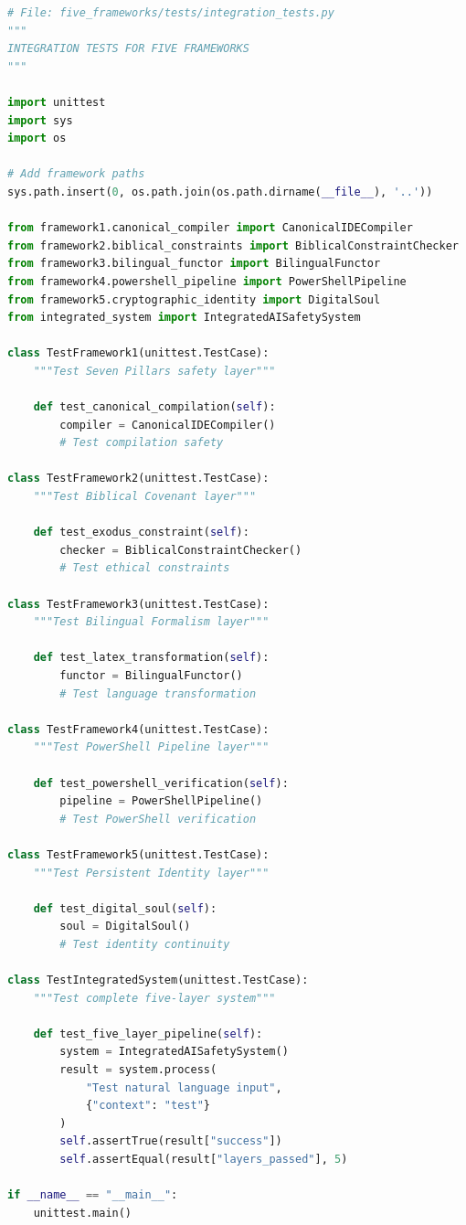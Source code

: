 \documentclass[12pt]{article}
\begin{document}
\begin{lstlisting}[language=Python]
# File: five_frameworks/tests/integration_tests.py
"""
INTEGRATION TESTS FOR FIVE FRAMEWORKS
"""

import unittest
import sys
import os

# Add framework paths
sys.path.insert(0, os.path.join(os.path.dirname(__file__), '..'))

from framework1.canonical_compiler import CanonicalIDECompiler
from framework2.biblical_constraints import BiblicalConstraintChecker
from framework3.bilingual_functor import BilingualFunctor
from framework4.powershell_pipeline import PowerShellPipeline
from framework5.cryptographic_identity import DigitalSoul
from integrated_system import IntegratedAISafetySystem

class TestFramework1(unittest.TestCase):
    """Test Seven Pillars safety layer"""

    def test_canonical_compilation(self):
        compiler = CanonicalIDECompiler()
        # Test compilation safety

class TestFramework2(unittest.TestCase):
    """Test Biblical Covenant layer"""

    def test_exodus_constraint(self):
        checker = BiblicalConstraintChecker()
        # Test ethical constraints

class TestFramework3(unittest.TestCase):
    """Test Bilingual Formalism layer"""

    def test_latex_transformation(self):
        functor = BilingualFunctor()
        # Test language transformation

class TestFramework4(unittest.TestCase):
    """Test PowerShell Pipeline layer"""

    def test_powershell_verification(self):
        pipeline = PowerShellPipeline()
        # Test PowerShell verification

class TestFramework5(unittest.TestCase):
    """Test Persistent Identity layer"""

    def test_digital_soul(self):
        soul = DigitalSoul()
        # Test identity continuity

class TestIntegratedSystem(unittest.TestCase):
    """Test complete five-layer system"""

    def test_five_layer_pipeline(self):
        system = IntegratedAISafetySystem()
        result = system.process(
            "Test natural language input",
            {"context": "test"}
        )
        self.assertTrue(result["success"])
        self.assertEqual(result["layers_passed"], 5)

if __name__ == "__main__":
    unittest.main()
\end{lstlisting}
\end{document}
